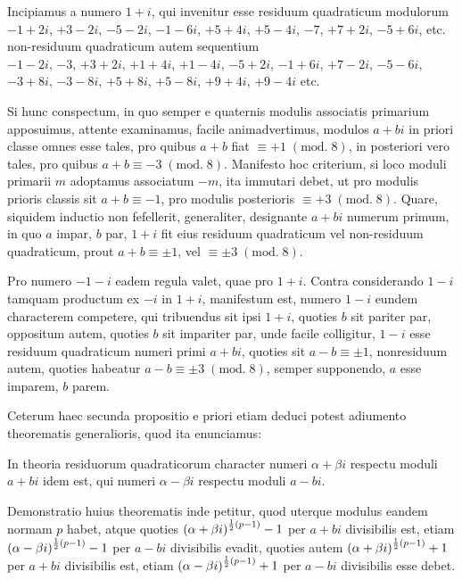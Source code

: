 \documentclass[twoside,12pt, showframe]{memoir}
\renewcommand{\pmod}[1]{\;(\textrm{mod.}\;#1)}
\let\oldfrac\frac
\def\frac#1#2{\mathchoice{\tfrac{#1}{#2}}{\oldfrac{#1}{#2}}{\genfrac{}{}{}{2}{#1}{#2\mathstrut}}{\genfrac{}{}{}{3}{#1}{#2\mathstrut}}}
\begin{document}
Incipiamus a numero \(1+i\), qui invenitur esse residuum quadraticum modulorum\\
\(-1+2 i\), \(+3-2 i\), \(-5-2 i\), \(-1-6 i\), \(+5+4 i\), \(+5-4 i\), \(-7\), \(+7+2 i\), \(-5+6 i\), etc.\\
non-residuum quadraticum autem sequentium\\
\(-1-2 i\), \(-3\), \(+3+2 i\), \(+1+4 i\), \(+1-4 i\), \(-5+2 i\), \(-1+6 i\), \(+7-2 i\), \(-5-6 i\), \(-3+8 i\), \(-3-8 i\), \(+5+8 i\), \(+5-8 i\), \(+9+4 i\), \(+9-4 i\) etc.

Si hunc conspectum, in quo semper e quaternis modulis associatis primarium apposuimus, attente examinamus, facile animadvertimus, modulos \(a+b i\) in priori classe omnes esse tales, pro quibus \(a+b\) fiat \(\equiv+1\pmod{8}\), in posteriori vero tales, pro quibus \(a+b \equiv-3\pmod{8}\). Manifesto hoc criterium, si loco moduli primarii \(m\) adoptamus associatum \(-m\), ita immutari debet, ut pro modulis prioris classis sit \(a+b \equiv-1\), pro modulis posterioris \(\equiv+3\pmod{8}\). Quare, siquidem inductio non fefellerit, generaliter, designante \(a+b i\) numerum primum, in quo \(a\) impar, \(b\) par, \(1+i\) fit eius residuum quadraticum vel non-residuum quadraticum, prout \(a+b \equiv \pm 1\), vel \(\equiv \pm 3\pmod{8}\).

Pro numero \(-1-i\) eadem regula valet, quae pro \(1+i\). Contra considerando \(1-i\) tamquam productum ex \(-i\) in \(1+i\), manifestum est, numero \(1-i\) eundem characterem competere, qui tribuendus sit ipsi \(1+i\), quoties \(b\) sit pariter par, oppositum autem, quoties \(b\) sit impariter par, unde facile colligitur, \(1-i\) esse residuum quadraticum numeri primi \(a+b i\), quoties sit \(a-b \equiv \pm 1\), nonresiduum autem, quoties habeatur \(a-b \equiv \pm 3\pmod{8}\), semper supponendo, \(a\) esse imparem, \(b\) parem.

Ceterum haec secunda propositio e priori etiam deduci potest adiumento theorematis generalioris, quod ita enunciamus:\clearpage\noindent%
 
In theoria residuorum quadraticorum character numeri \(\alpha+\beta i\) respectu moduli \(a+b i\) idem est, qui numeri \(\alpha-\beta i\) respectu moduli \(a-b i\).
 
Demonstratio huius theorematis inde petitur, quod uterque modulus eandem normam \(p\) habet, atque quoties \((\alpha+\beta i)^{\frac{1}{2}(p-1)}-1\) per \(a+b i\) divisibilis est, etiam \((\alpha-\beta i)^{\frac{1}{2}(p-1)}-1\) per \(a-b i\) divisibilis evadit, quoties autem \((\alpha+\beta i)^{\frac{1}{2}(p-1)}+1\) per \(a+b i\) divisibilis est, etiam \((\alpha-\beta i)^{\frac{1}{2}(p-1)}+1\) per \(a-b i\) divisibilis esse debet.
\end{document}
